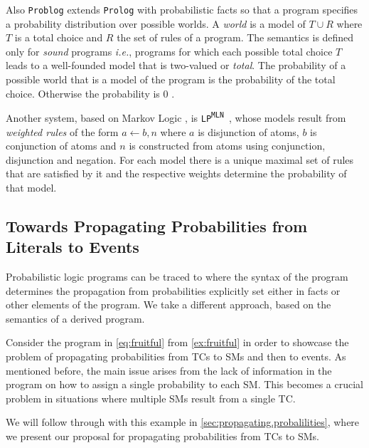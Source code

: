 \documentclass[a4paper]{article}
\renewcommand{\cite}{\citep}
\newcommand{\clause}{\ensuremath{\leftarrow}}
\newcommand{\lpmln}{\texttt{LP\textsuperscript{MLN}}}
\begin{document}
Also \texttt{Problog} \cite{fierens2015inference,verreet2022inference}
extends \texttt{Prolog} with probabilistic facts so that a program
specifies a probability distribution over possible worlds.  A
\textit{world} is a model of \(T \cup R\) where \(T\) is a total
choice and \(R\) the set of rules of a program.  The semantics is
defined only for \textit{sound} programs \cite{riguzzi2013well}
\textit{i.e.}, programs for which each possible total choice \(T\)
leads to a well-founded model that is two-valued or \textit{total}.
The probability of a possible world that is a model of the program is
the probability of the total choice.  Otherwise the probability is
\(0\) \cite{riguzzi2013well,van1991well}.

Another system, based on Markov Logic \cite{richardson2006markov}, is
\lpmln\ \cite{lee2016weighted,lee2017lpmln}, whose models result from
\textit{weighted rules} of the form \(a \clause b, n\) where \(a\)
is disjunction of atoms, \(b\) is conjunction of atoms and \(n\) is
constructed from atoms using conjunction, disjunction and negation.
For each model there is a unique maximal set of rules that are
satisfied by it and the respective weights determine the probability
of that model.


\subsection*{Towards Propagating Probabilities from Literals to Events}
\label{sec:example.1}

Probabilistic logic programs can be traced to \cite{kifer1992theory}
where the syntax of the program determines the propagation from
probabilities explicitly set either in facts or other elements of the
program.  We take a different approach, based on the semantics of a
derived program.

Consider the program in \cref{eq:fruitful} from \cref{ex:fruitful} in
order to showcase the problem of propagating probabilities from
\aclp{TC} to \aclp{SM} and then to events.  As mentioned before, the
main issue arises from the lack of information in the program on how
to assign a single probability to each \acl{SM}.  This becomes a
crucial problem in situations where multiple \aclp{SM} result from a
single \acl{TC}.

We will follow through with this example in
\cref{sec:propagating.probalilities}, where we present our proposal
for propagating probabilities from \aclp{TC} to \aclp{SM}.
\end{document}
